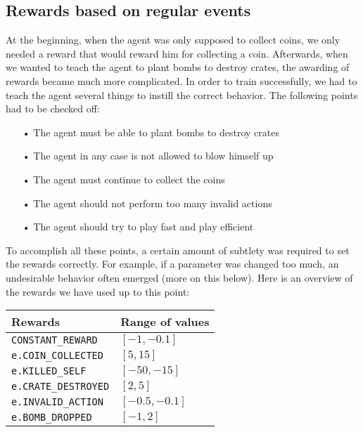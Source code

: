\subsection{Rewards based on regular events}
At the beginning, when the agent was only supposed to collect coins, we only needed a reward that would reward him for collecting a coin. Afterwards, when we wanted to teach the agent to plant bombs to destroy crates, the awarding of rewards became much more complicated. In order to train successfully, we had to teach the agent several things to instill the correct behavior. The following points had to be checked off:
\begin{itemize}
\item[•] The agent must be able to plant bombs to destroy crates
\item[•] The agent in any case is not allowed to blow himself up
\item[•] The agent must continue to collect the coins
\item[•] The agent should not perform too many invalid actions
\item[•] The agent should try to play fast and play efficient
\end{itemize}
To accomplish all these points, a certain amount of subtlety was required to set the rewards correctly. For example, if a parameter was changed too much, an undesirable behavior often emerged (more on this below). Here is an overview of the rewards we have used up to this point:

\begin{table}[h!]
\centering
\begin{tabular}{|| l | l||} 
 \hline
 Rewards &  Range of values\\ [0.5ex] 
 \hline\hline
  \texttt{CONSTANT\_REWARD} & $[-1,-0.1]$  \\[0.5ex] 
  \texttt{e.COIN\_COLLECTED} & $[5, 15]$ \\ [0.5ex] 
  \texttt{e.KILLED\_SELF} & $[-50 , -15]$ \\[0.5ex] 
  \texttt{e.CRATE\_DESTROYED} & $[2, 5]$ \\[0.5ex] 
  \texttt{e.INVALID\_ACTION} & $[-0.5,-0.1]$  \\[0.5ex] 
  \texttt{e.BOMB\_DROPPED} & $[-1, 2]$   \\ [1ex] 
 \hline
\end{tabular}
\end{table}

